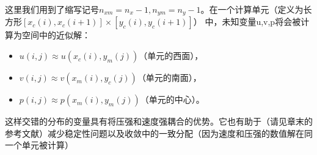 \documentclass[nofonts]{ctexart} %
\begin{document}
这里我们用到了缩写记号$n_{xm}=n_x-1,n_{ym}=n_y-1$。在一个计算单元（定义为长方形$[x_c(i),x_c(i+1)]\times[y_c(i),y_c(i+1)]$）
中，未知变量u,v,p将会被计算为空间中的近似解：
\begin{itemize}
    \item $u(i,j)\approx u(x_c(i),y_m(j)) $（单元的西面），
    \item  $v(i,j)\approx v(x_m(i),y_c(j))$（单元的南面），
    \item  $p(i,j)\approx p(x_m(i),y_m(j))$（单元的中心）。
\end{itemize}
这样交错的分布的变量具有将压强和速度强耦合的优势。它也有助于（请见章末的参考文献）减少稳定性问题以及收敛中的一致分配（因为速度和压强的数值解在同一个单元被计算）



\end{document}
